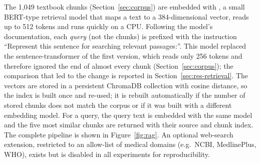 The 1{,}049 textbook chunks (Section~\ref{sec:corpus}) are embedded with  \cite{xiao2023cpack}, a small BERT-type retrieval model that maps a text to a 384-dimensional vector, reads up to 512 tokens and runs quickly on a CPU. Following the model's documentation, each \emph{query} (not the chunks) is prefixed with the instruction ``Represent this sentence for searching relevant passages:''. This model replaced the sentence-transformer  \cite{reimers2019,wang2020minilm} of the first version, which reads only 256 tokens and therefore ignored the end of almost every chunk (Section~\ref{sec:corpus}); the comparison that led to the change is reported in Section~\ref{sec:res-retrieval}. The vectors are stored in a persistent ChromaDB collection \cite{chroma} with cosine distance, so the index is built once and re-used; it is rebuilt automatically if the number of stored chunks does not match the corpus or if it was built with a different embedding model. For a query, the query text is embedded with the same model and the five most similar chunks are returned with their source and chunk index. The complete pipeline is shown in Figure~\ref{fig:rag}. An optional web-search extension, restricted to an allow-list of medical domains (e.g.\ NCBI, MedlinePlus, WHO), exists but is disabled in all experiments for reproducibility.

